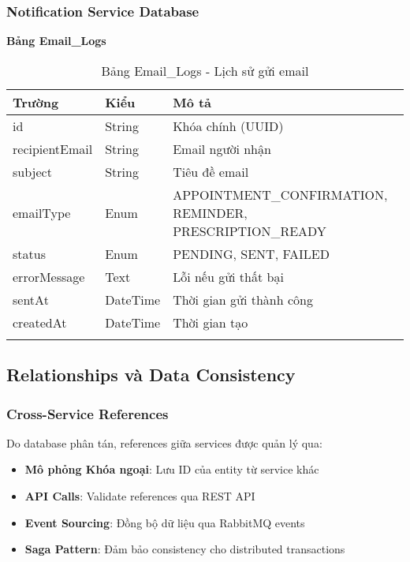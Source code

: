 \documentclass[12pt,a4paper]{report}
\begin{document}
    \subsubsection{Notification Service Database}
    \textbf{Bảng Email\_Logs}
    \begin{longtable}{|p{3cm}|p{2cm}|p{8cm}|}
    \hline
    \textbf{Trường} & \textbf{Kiểu} & \textbf{Mô tả} \\
    \hline
    id & String & Khóa chính (UUID) \\
    \hline
    recipientEmail & String & Email người nhận \\
    \hline
    subject & String & Tiêu đề email \\
    \hline
    emailType & Enum & APPOINTMENT\_CONFIRMATION, REMINDER, PRESCRIPTION\_READY \\
    \hline
    status & Enum & PENDING, SENT, FAILED \\
    \hline
    errorMessage & Text & Lỗi nếu gửi thất bại \\
    \hline
    sentAt & DateTime & Thời gian gửi thành công \\
    \hline
    createdAt & DateTime & Thời gian tạo \\
    \hline
    \caption{Bảng Email\_Logs - Lịch sử gửi email}
    \end{longtable}

    \subsection{Relationships và Data Consistency}

    \subsubsection{Cross-Service References}
    Do database phân tán, references giữa services được quản lý qua:
    \begin{itemize}
        \item \textbf{Mô phỏng Khóa ngoại}: Lưu ID của entity từ service khác
        \item \textbf{API Calls}: Validate references qua REST API
        \item \textbf{Event Sourcing}: Đồng bộ dữ liệu qua RabbitMQ events
        \item \textbf{Saga Pattern}: Đảm bảo consistency cho distributed transactions
    \end{itemize}
\end{document}

